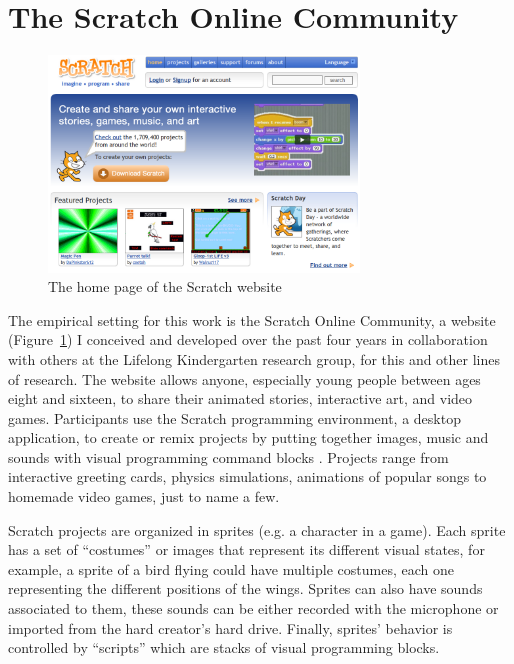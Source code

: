 \section{The Scratch Online Community}

\begin{figure}
\centering
\includegraphics[width=3.25in]{figures/websitehomepage.png}
\caption{The home page of the Scratch website}
\label{fig:websitehomepage}
\end{figure}

The empirical setting for this work is the Scratch Online Community, a website (Figure~\ref{fig:websitehomepage}) I conceived and developed over the past four years in collaboration with others at the Lifelong Kindergarten research group, for this and other lines of research.
The website allows anyone, especially young people between ages eight and sixteen, to share their animated stories, interactive art, and video games. Participants use the Scratch programming environment, a desktop application, to create or remix projects by putting together images, music and sounds with visual programming command blocks \citep{resnick_scratch:_2009}.
Projects range from interactive greeting cards, physics simulations, animations of popular songs to homemade video games, just to name a few.  

Scratch projects are organized in sprites (e.g. a character in a game).
Each sprite has a set of ``costumes'' or images that represent its different visual states, for example, a sprite of a bird flying could have multiple costumes, each one representing the different positions of the wings. 
Sprites can also have sounds associated to them, these sounds can be either recorded with the microphone or imported from the hard creator's hard drive. Finally, sprites' behavior is controlled by ``scripts'' which are stacks of visual programming blocks. 

